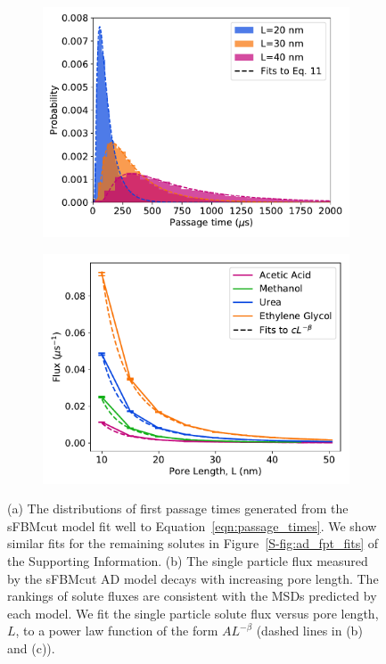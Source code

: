 \documentclass[journal=jctcce,manuscript=article]{achemso}
\begin{document}
  \begin{figure}
  \centering
  \begin{subfigure}{0.485\textwidth}
  \includegraphics[width=\textwidth]{fpt_distributions.pdf}
  \caption{}\label{fig:fpt_distributions}
  \end{subfigure}
  \begin{subfigure}{0.485\textwidth}
  \includegraphics[width=\textwidth]{flux_curves.pdf}
  \caption{}\label{fig:flux_curves_ad}
  \end{subfigure}
  \caption{(a) The distributions of first passage times generated from the
	  sFBMcut model fit well to Equation~\ref{eqn:passage_times}. We show
	  similar fits for the remaining solutes in
	  Figure~\ref{S-fig:ad_fpt_fits} of the Supporting Information. (b) The
	  single particle flux measured by the sFBMcut AD model decays with
	  increasing pore length. The rankings of solute fluxes are consistent
	  with the MSDs predicted by each model. We fit the single particle
	  solute flux versus pore length, $L$, to a power law function of the
	  form $AL^{-\beta}$ (dashed lines in (b) and (c)). 
  }\label{fig:flux_curves}
  \end{figure}
\end{document}
